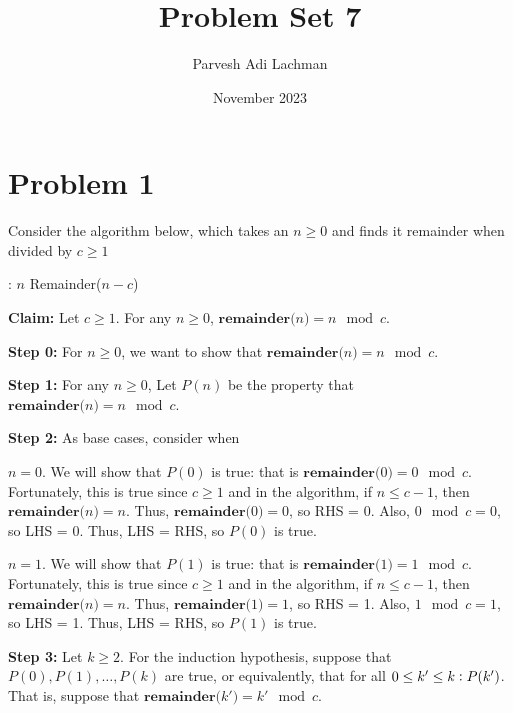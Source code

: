 \documentclass{article}
\title{Problem Set 7}
\author{Parvesh Adi Lachman}
\date{November 2023}
\begin{document}
\maketitle
\section{Problem 1}

Consider the algorithm below, which takes an $n\geq 0$ and finds it remainder when divided by $c\geq 1$

\vspace{15pt}

\begin{algorithmic}
:
\State \Return $n$
\Else
\State \Return Remainder($n-c$)
\EndIf
\EndFunction
\end{algorithmic}

\vspace{10pt}


\noindent\textbf{Claim:} Let $c\geq 1$. For any $n\geq 0$, $\textbf{remainder($n$)}=n\mod c$.
\vspace{10pt}


\textbf{Step 0:} For $n\geq 0$, we want to show that $\textbf{remainder($n$)}=n\mod c$. 
\vspace{15pt}

\textbf{Step 1:} For any $n\geq 0$, Let $P(n)$ be the property that $\textbf{remainder($n$)}=n\mod c$.
\vspace{15pt}

\textbf{Step 2:} As base cases, consider when\vspace{10pt}


$n=0$. We will show that $P(0)$ is true: that is $\textbf{remainder($0$)}=0\mod c$. Fortunately, this is true since $c\geq 1$ and in the algorithm, if $n\leq c-1$, then $\textbf{remainder($n$)}=n$. Thus, $\textbf{remainder($0$)}=0$, so RHS = 0. Also, $0\mod c=0$, so LHS = 0. Thus, LHS = RHS, so $P(0)$ is true.
\vspace{10pt}

$n=1$. We will show that $P(1)$ is true: that is $\textbf{remainder($1$)}=1\mod c$. Fortunately, this is true since $c\geq 1$ and in the algorithm, if $n\leq c-1$, then $\textbf{remainder($n$)}=n$. Thus, $\textbf{remainder($1$)}=1$, so RHS = 1. Also, $1\mod c=1$, so LHS = 1. Thus, LHS = RHS, so $P(1)$ is true.


\vspace{15pt}
\pagebreak
\textbf{Step 3:} Let $k\geq 2$. For the induction hypothesis, suppose that $P(0),P(1),\ldots,P(k)$ are true, or equivalently, that for all $0\leq k'\leq k\vcentcolon P(k')$. That is, suppose that $\textbf{remainder($k'$)}=k'\mod c$.
\vspace{15pt}
\end{document}
